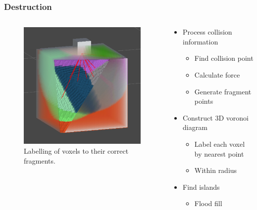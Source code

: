 \documentclass{beamer}
\begin{document}
	\begin{frame}
	\frametitle{Destruction}
		\begin{columns}[T] %
			\begin{column}[T]{5cm} %
				\begin{figure}
					\centerline{\includegraphics[scale=0.5]{Voronoi.png}}
					\caption{Labelling of voxels to their correct fragments.}
				\end{figure}
			\end{column}
			\begin{column}[T]{5cm} %
				\begin{itemize}
				\item{Process collision information}
					\begin{itemize}
						\item{Find collision point} 
						\item{Calculate force}
						\item{Generate fragment points}
					\end{itemize}
				\item{Construct 3D voronoi diagram}
					\begin{itemize}
						\item{Label each voxel by nearest point}
						\item{Within radius}
					\end{itemize}
				\item{Find islands}
					\begin{itemize}
						\item{Flood fill}
					\end{itemize}
				\end{itemize}
			\end{column}
		\end{columns}
	\end{frame}
\end{document}
